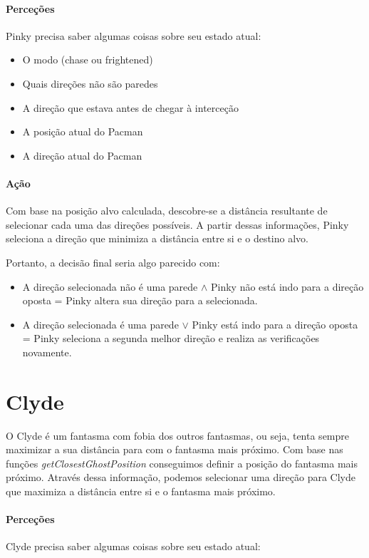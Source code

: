 \documentclass[12pt]{article}
\begin{document}
\paragraph*{Perceções}
Pinky precisa saber algumas coisas sobre seu estado atual:

\begin{itemize}
    \item O modo (chase ou frightened)
    \item Quais direções não são paredes
    \item A direção que estava antes de chegar à interceção
    \item A posição atual do Pacman
    \item A direção atual do Pacman
\end{itemize}

\paragraph*{Ação} 
Com base na posição alvo calculada, descobre-se a distância resultante de selecionar cada uma das direções possíveis. A partir dessas informações, Pinky seleciona a direção que minimiza a distância entre si e o destino alvo.

Portanto, a decisão final seria algo parecido com:
\begin{itemize}
    \item A direção selecionada não é uma parede $\land$ Pinky não está indo para a direção oposta = Pinky altera sua direção para a selecionada.
    
    \item A direção selecionada é uma parede $\lor$ Pinky está indo para a direção oposta = Pinky seleciona a segunda melhor direção e realiza as verificações novamente.
\end{itemize}

\section*{Clyde}
O Clyde é um fantasma com fobia dos outros fantasmas, ou seja, tenta sempre maximizar a sua distância para com o fantasma mais próximo. Com base nas funções \textit{getClosestGhostPosition} conseguimos definir a posição do fantasma mais próximo. Através dessa informação, podemos selecionar uma direção para Clyde que maximiza a distância entre si e o fantasma mais próximo.

\paragraph*{Perceções}
Clyde precisa saber algumas coisas sobre seu estado atual:
\end{document}
